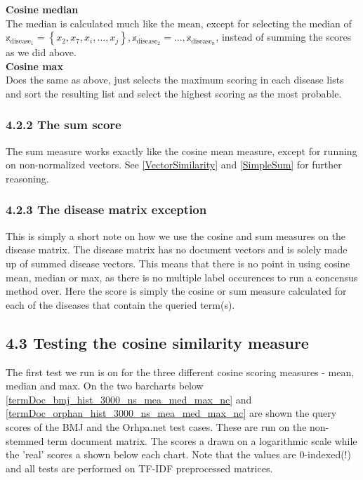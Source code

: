 \textbf{Cosine median} \\
The median is calculated much like the mean, except for selecting the median of $\mathbb{x}_{\textrm{disease}_{1}} = \left\{x_2,x_7, x_i, \dots, x_j\right\}, \mathbb{x}_{\textrm{disease}_{2}} = \dots, \mathbb{x}_{\textrm{disease}_{n}}$, instead of summing the scores as we did above. \\

\textbf{Cosine max} \\
Does the same as above, just selects the maximum scoring in each disease lists and sort the resulting list and select the highest scoring as the most probable.

\subsubsection{4.2.2 The sum score}

The sum measure works exactly like the cosine mean measure, except for running on non-normalized vectors. See \ref{VectorSimilarity} and \ref{SimpleSum} for further reasoning.

\subsubsection{4.2.3 The disease matrix exception}

This is simply a short note on how we use the cosine and sum measures on the disease matrix. The disease matrix has no document vectors and is solely made up of summed disease vectors. This means that there is no point in using cosine mean, median or max, as there is no multiple label occurences to run a concensus method over. Here the score is simply the cosine or sum measure calculated for each of the diseases that contain the queried term(s). \\

\subsection{4.3 Testing the cosine similarity measure\label{TestingCosineSimilarity}}

The first test we run is on for the three different cosine scoring measures - mean, median and max. On the two barcharts below \ref{termDoc_bmj_hist_3000_ns_mea_med_max_nc} and \ref{termDoc_orphan_hist_3000_ns_mea_med_max_nc} are shown the query scores of the BMJ and the Orhpa.net test cases. These are run on the non-stemmed term document matrix. The scores a drawn on a logarithmic scale while the 'real' scores a shown below each chart. Note that the values are 0-indexed(!) and all tests are performed on TF-IDF preprocessed matrices. \\


